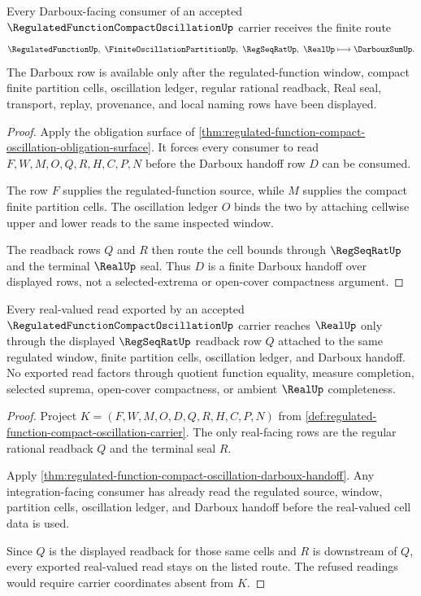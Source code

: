 \begin{theorem}
\label{thm:regulated-function-compact-oscillation-darboux-handoff}
Every Darboux-facing consumer of an accepted $\RegulatedFunctionCompactOscillationUp$ carrier receives the finite route
$$
\RegulatedFunctionUp,\ \FiniteOscillationPartitionUp,\ \RegSeqRatUp,\ \RealUp \longmapsto \DarbouxSumUp .
$$
The Darboux row is available only after the regulated-function window, compact finite partition cells, oscillation ledger, regular rational readback, Real seal, transport, replay, provenance, and local naming rows have been displayed.
\end{theorem}
\begin{proof}
Apply the obligation surface of \autoref{thm:regulated-function-compact-oscillation-obligation-surface}. It forces every consumer to read $F,W,M,O,Q,R,H,C,P,N$ before the Darboux handoff row $D$ can be consumed.

The row $F$ supplies the regulated-function source, while $M$ supplies the compact finite partition cells. The oscillation ledger $O$ binds the two by attaching cellwise upper and lower reads to the same inspected window.

The readback rows $Q$ and $R$ then route the cell bounds through $\RegSeqRatUp$ and the terminal $\RealUp$ seal. Thus $D$ is a finite Darboux handoff over displayed rows, not a selected-extrema or open-cover compactness argument.
\end{proof}

\begin{theorem}
\label{thm:regulated-function-compact-oscillation-real-seal-route}
Every real-valued read exported by an accepted $\RegulatedFunctionCompactOscillationUp$ carrier reaches $\RealUp$ only through the displayed $\RegSeqRatUp$ readback row $Q$ attached to the same regulated window, finite partition cells, oscillation ledger, and Darboux handoff. No exported read factors through quotient function equality, measure completion, selected suprema, open-cover compactness, or ambient $\RealUp$ completeness.
\end{theorem}
\begin{proof}
Project $K=(F,W,M,O,D,Q,R,H,C,P,N)$ from \autoref{def:regulated-function-compact-oscillation-carrier}. The only real-facing rows are the regular rational readback $Q$ and the terminal seal $R$.

Apply \autoref{thm:regulated-function-compact-oscillation-darboux-handoff}. Any integration-facing consumer has already read the regulated source, window, partition cells, oscillation ledger, and Darboux handoff before the real-valued cell data is used.

Since $Q$ is the displayed readback for those same cells and $R$ is downstream of $Q$, every exported real-valued read stays on the listed route. The refused readings would require carrier coordinates absent from $K$.
\end{proof}

